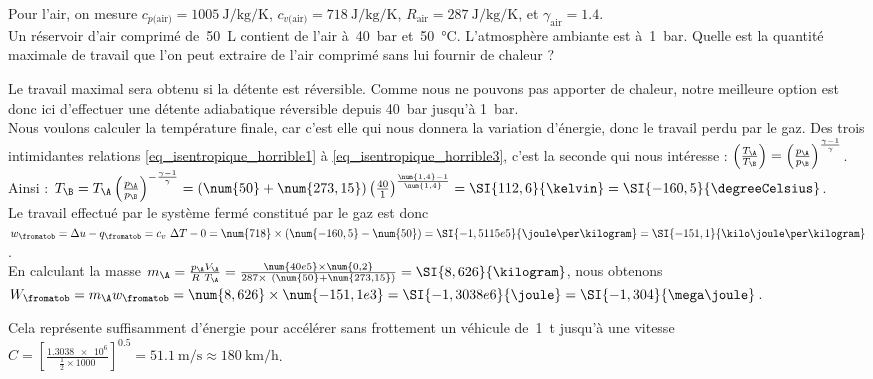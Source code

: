 		\begin{anexample}
			Pour l’air, on mesure $c_{p\text{(air)}} = \SI{1005}{\joule\per\kilogram\per\kelvin}$, $c_{v\text{(air)}} = \SI{718}{\joule\per\kilogram\per\kelvin}$, $R_\text{air} = \SI{287}{\joule\per\kilogram\per\kelvin}$, et $\gamma_\text{air} = \num{1,4}$.\\
			Un réservoir d’air comprimé de~\SI{50}{\liter} contient de l’air à~\SI{40}{\bar} et~\SI{50}{\degreeCelsius}. L’atmosphère ambiante est à~\SI{1}{\bar}. Quelle est la quantité maximale de travail que l’on peut extraire de l’air comprimé sans lui fournir de chaleur ?
				\begin{answer}
					Le travail maximal sera obtenu si la détente est réversible. Comme nous ne pouvons pas apporter de chaleur, notre meilleure option est donc ici d’effectuer une détente adiabatique réversible depuis \SI{40}{\bar} jusqu’à \SI{1}{\bar}.\\
					Nous voulons calculer la température finale, car c’est elle qui nous donnera la variation d’énergie, donc le travail perdu par le gaz. Des trois intimidantes relations \ref{eq_isentropique_horrible1} à \ref{eq_isentropique_horrible3}, c’est la seconde qui nous intéresse : $\left( \frac{T_\A}{T_\B} \right)	= \left( \frac{p_\A}{p_\B} \right)^{\frac{\gamma -1}{\gamma}}$. Ainsi : $T_\B = T_\A \left( \frac{p_\A}{p_\B} \right)^{-\frac{\gamma -1}{\gamma}} = (\num{50} + \num{273,15}) \left( \frac{40}{1} \right)^{\frac{\num{1,4} -1}{\num{1,4}}} = \SI{112,6}{\kelvin} = \SI{-160,5}{\degreeCelsius}$.\\
					Le travail effectué par le système fermé constitué par le gaz est donc $w_\fromatob = \Delta u - q_\fromatob = c_v \ \Delta T - 0 = \num{718} \times (\num{-160,5} - \num{50}) = \SI{-1,5115e5}{\joule\per\kilogram} = \SI{-151,1}{\kilo\joule\per\kilogram}$.\\
					En calculant la masse $m_\A = \frac{p_\A V_\A}{R \ T_\A} = \frac{\num{40e5} \times \num{0,2}}{287 \times \ (\num{50} + \num{273,15})} = \SI{8,626}{\kilogram}$, nous obtenons $W_\fromatob = m_\A w_\fromatob = \num{8,626} \times \num{-151,1e3} = \SI{-1,3038e6}{\joule} = \SI{-1,304}{\mega\joule}$.
					\begin{remark} Cela représente suffisamment d’énergie pour accélérer sans frottement un véhicule de~\SI{1}{\tonne} jusqu’à une vitesse $C = \left[\frac{\num{1,3038e6}}{\frac{1}{2} \times \num{1000}}\right]^{\num{0,5}} = \SI{51,1}{\metre\per\second} \approx \SI[per-mode = symbol]{180}{\kilo\metre\per\hour}$.\end{remark}

\end{answer}
\end{anexample}
